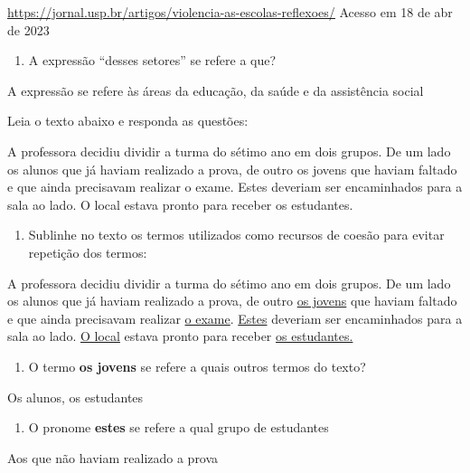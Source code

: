 {\href{https://jornal.usp.br/artigos/violencia-as-escolas-reflexoes/}{\uline{https://jornal.usp.br/artigos/violencia-as-escolas-reflexoes/}}
Acesso em 18 de abr de 2023

\begin{enumerate}
\def\labelenumi{\arabic{enumi})}
\setcounter{enumi}{3}
\tightlist
\item
  A expressão ``desses setores'' se refere a que?
\end{enumerate}

A expressão se refere às áreas da educação, da saúde e da assistência
social

Leia o texto abaixo e responda as questões:

A professora decidiu dividir a turma do sétimo ano em dois grupos. De um
lado os alunos que já haviam realizado a prova, de outro os jovens que
haviam faltado e que ainda precisavam realizar o exame. Estes deveriam
ser encaminhados para a sala ao lado. O local estava pronto para receber
os estudantes.

\begin{enumerate}
\def\labelenumi{\arabic{enumi})}
\setcounter{enumi}{4}
\tightlist
\item
  Sublinhe no texto os termos utilizados como recursos de coesão para
  evitar repetição dos termos:
\end{enumerate}

A professora decidiu dividir a turma do sétimo ano em dois grupos. De um
lado os alunos que já haviam realizado a prova, de outro \uline{os
jovens} que haviam faltado e que ainda precisavam realizar \uline{o
exame}. \uline{Estes} deveriam ser encaminhados para a sala ao lado.
\uline{O local} estava pronto para receber \uline{os estudantes.}

\begin{enumerate}
\def\labelenumi{\arabic{enumi})}
\setcounter{enumi}{5}
\tightlist
\item
  O termo \textbf{os jovens} se refere a quais outros termos do texto?
\end{enumerate}

Os alunos, os estudantes

\begin{enumerate}
\def\labelenumi{\arabic{enumi})}
\setcounter{enumi}{6}
\tightlist
\item
  O pronome \textbf{estes} se refere a qual grupo de estudantes
\end{enumerate}

Aos que não haviam realizado a prova

}
